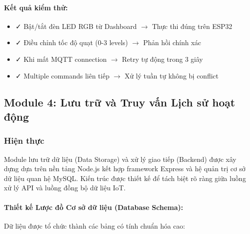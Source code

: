 \paragraph{Kết quả kiểm thử:}
\begin{itemize}
    \item ✓ Bật/tắt đèn LED RGB từ Dashboard $\rightarrow$ Thực thi đúng trên ESP32
    \item ✓ Điều chỉnh tốc độ quạt (0-3 levels) $\rightarrow$ Phản hồi chính xác

    \item ✓ Khi mất MQTT connection $\rightarrow$ Retry tự động trong 3 giây
    \item ✓ Multiple commands liên tiếp $\rightarrow$ Xử lý tuần tự không bị conflict
\end{itemize}

\subsection{Module 4: Lưu trữ và Truy vấn Lịch sử hoạt động}

\subsubsection{Hiện thực}

Module lưu trữ dữ liệu (Data Storage) và xử lý giao tiếp (Backend) được xây dựng dựa trên nền tảng Node.js kết hợp framework Express và hệ quản trị cơ sở dữ liệu quan hệ MySQL. Kiến trúc được thiết kế để tách biệt rõ ràng giữa luồng xử lý API và luồng đồng bộ dữ liệu IoT.

\paragraph{Thiết kế Lược đồ Cơ sở dữ liệu (Database Schema):}

Dữ liệu được tổ chức thành các bảng có tính chuẩn hóa cao:

